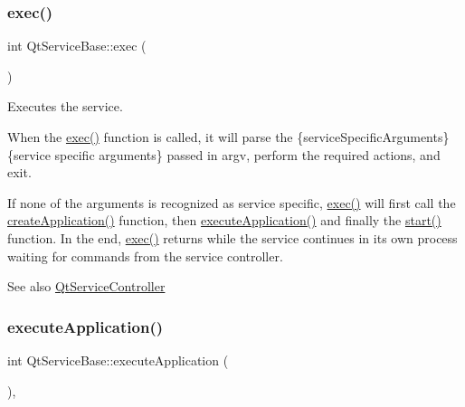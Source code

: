\mbox{\label{class_qt_service_base_afae2e589de71c1ae3ae8db3dc9ab9c64}} 
\subsubsection{\texorpdfstring{exec()}{exec()}}
{\footnotesize\ttfamily int Qt\+Service\+Base\+::exec (\begin{DoxyParamCaption}{ }\end{DoxyParamCaption})}

Executes the service.

When the \hyperlink{class_qt_service_base_afae2e589de71c1ae3ae8db3dc9ab9c64}{exec()} function is called, it will parse the  \{service\+Specific\+Arguments\} \{service specific arguments\} passed in {\ttfamily argv}, perform the required actions, and exit.

If none of the arguments is recognized as service specific, \hyperlink{class_qt_service_base_afae2e589de71c1ae3ae8db3dc9ab9c64}{exec()} will first call the \hyperlink{class_qt_service_base_ac5ae73935f489282b35c70b27b341390}{create\+Application()} function, then \hyperlink{class_qt_service_base_ab70633cd29a22758dfa0502b77e564f6}{execute\+Application()} and finally the \hyperlink{class_qt_service_base_adbc0cd621b41bd3a6a1f62fda432e9e4}{start()} function. In the end, \hyperlink{class_qt_service_base_afae2e589de71c1ae3ae8db3dc9ab9c64}{exec()} returns while the service continues in its own process waiting for commands from the service controller.

\begin{DoxySeeAlso}{See also}
\hyperlink{class_qt_service_controller}{Qt\+Service\+Controller} 
\end{DoxySeeAlso}
\mbox{\label{class_qt_service_base_ab70633cd29a22758dfa0502b77e564f6}} 
\subsubsection{\texorpdfstring{execute\+Application()}{executeApplication()}}
{\footnotesize\ttfamily int Qt\+Service\+Base\+::execute\+Application (\begin{DoxyParamCaption}{ }\end{DoxyParamCaption})\hspace{0.3cm}{\ttfamily [protected]}, {}}

